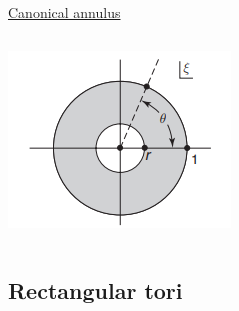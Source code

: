 \documentclass[11pt,aspectratio=169]{beamer}
\begin{document}
\begin{frame}{\underline{Canonical annulus}}
\begin{columns}
\begin{column}{0.25\textwidth}
			\includegraphics[width=\columnwidth]{elements/canonical annulus.PNG}
		\end{column}
	\end{columns}
	
\end{frame}

\subsection{Rectangular tori}
\end{document}

